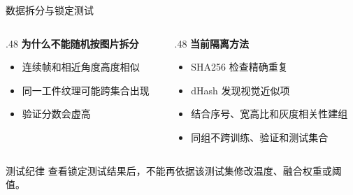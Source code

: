 \documentclass[aspectratio=169,10pt]{beamer}
\begin{document}
\begin{frame}{数据拆分与锁定测试}
  \centering

  \vspace{1em}
  \begin{columns}[T,onlytextwidth]
    \begin{column}{.48\textwidth}
      \textbf{为什么不能随机按图片拆分}
      \begin{itemize}
        \item 连续帧和相近角度高度相似
        \item 同一工件纹理可能跨集合出现
        \item 验证分数会虚高
      \end{itemize}
    \end{column}
    \begin{column}{.48\textwidth}
      \textbf{当前隔离方法}
      \begin{itemize}
        \item SHA256 检查精确重复
        \item dHash 发现视觉近似项
        \item 结合序号、宽高比和灰度相关性建组
        \item 同组不跨训练、验证和测试集合
      \end{itemize}
    \end{column}
  \end{columns}

  \vfill
  \begin{alertblock}{测试纪律}
    查看锁定测试结果后，不能再依据该测试集修改温度、融合权重或阈值。
  \end{alertblock}
\end{frame}
\end{document}
